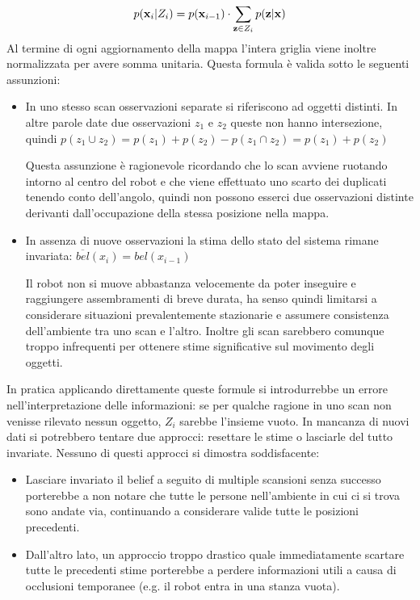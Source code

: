 \documentclass[10pt]{beamer}
\begin{document}
	\begin{equation}\label{eq:belief-update}
		p({\bf x}_i | Z_i) = p({\bf x}_{i-1}) \cdot 
		\sum_{{\bf z} \in Z_i} p({\bf z} | {\bf x})
	\end{equation}
	Al termine di ogni aggiornamento della mappa l'intera griglia viene inoltre
	normalizzata per avere somma unitaria.  
	Questa formula è valida sotto le seguenti assunzioni:
	\begin{itemize}
		\item In uno stesso scan osservazioni separate si riferiscono ad
			oggetti distinti. In altre parole date due osservazioni $z_1$ e
			$z_2$ queste non hanno intersezione, quindi $ p(z_1 \cup z_2) =
			p(z_1)+p(z_2)-p( z_1 \cap z_2) = p(z_1)+p(z_2) $ 

			Questa assunzione è ragionevole ricordando che lo scan avviene
			ruotando intorno al centro del robot e che viene effettuato uno
			scarto dei duplicati tenendo conto dell'angolo, quindi non possono
			esserci due osservazioni distinte derivanti dall'occupazione della
			stessa posizione nella mappa.

		\item In assenza di nuove osservazioni la stima dello stato del sistema
			rimane invariata: $ \overline{bel}(x_i) = bel(x_{i-1}) $ 

			Il robot non si muove abbastanza velocemente da poter inseguire e
			raggiungere assembramenti di breve durata, ha senso quindi
			limitarsi a considerare situazioni prevalentemente stazionarie e
			assumere consistenza dell'ambiente tra uno scan e l'altro. Inoltre
			gli scan sarebbero comunque troppo infrequenti per ottenere stime
			significative sul movimento degli oggetti.

	\end{itemize}

	In pratica applicando direttamente queste formule si introdurrebbe un
	errore nell'interpretazione delle informazioni: se per qualche ragione in
	uno scan non venisse rilevato nessun oggetto, $ Z_i $ sarebbe l'insieme
	vuoto. In mancanza di nuovi dati si potrebbero tentare due approcci:
	resettare le stime o lasciarle del tutto invariate. Nessuno di questi
	approcci si dimostra soddisfacente:
	\begin{itemize} 
		\item Lasciare invariato il belief a seguito di multiple scansioni
			senza successo porterebbe a non notare che tutte le persone
			nell'ambiente in cui ci si trova sono andate via, continuando a
			considerare valide tutte le posizioni precedenti.
		\item Dall'altro lato, un approccio troppo drastico quale
			immediatamente scartare tutte le precedenti stime porterebbe a
			perdere informazioni utili a causa di occlusioni temporanee (e.g.
			il robot entra in una stanza vuota).
	\end{itemize}
\end{document}
